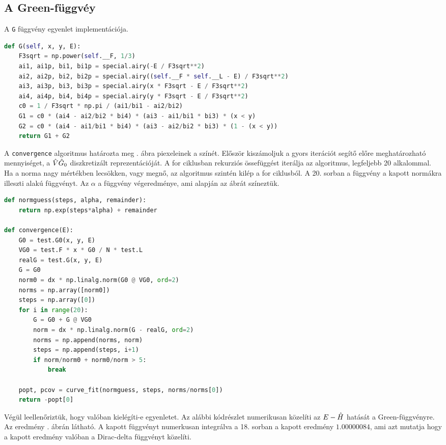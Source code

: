 \subsection{A Green-függvéy}
A \texttt{G} függvény  egyenlet implementációja. 
\begin{lstlisting}[language=Python]
def G(self, x, y, E):
    F3sqrt = np.power(self.__F, 1/3)
    ai1, ai1p, bi1, bi1p = special.airy(-E / F3sqrt**2)
    ai2, ai2p, bi2, bi2p = special.airy((self.__F * self.__L - E) / F3sqrt**2)
    ai3, ai3p, bi3, bi3p = special.airy(x * F3sqrt - E / F3sqrt**2)
    ai4, ai4p, bi4, bi4p = special.airy(y * F3sqrt - E / F3sqrt**2)
    c0 = 1 / F3sqrt * np.pi / (ai1/bi1 - ai2/bi2)
    G1 = c0 * (ai4 - ai2/bi2 * bi4) * (ai3 - ai1/bi1 * bi3) * (x < y)
    G2 = c0 * (ai4 - ai1/bi1 * bi4) * (ai3 - ai2/bi2 * bi3) * (1 - (x < y))
    return G1 + G2
\end{lstlisting}
A \texttt{convergence} algoritmus határozta meg . ábra piexeleinek a színét. Először kiszámoljuk a gyors iterációt segítő előre meghatározható mennyiséget, a $\hat{V}\hat{G}_0$ diszkretizált reprezentációját. A for ciklusban  rekurziós össefüggést iterálja az algoritmus, legfeljebb 20 alkalommal. Ha a norma nagy mértékben lecsökken, vagy megnő, az algoritmus szintén kilép a for ciklusból. A 20. sorban a függvény a kapott normákra illeszti  alakú függvényt. Az $\alpha$ a függvény végeredménye, ami alapján az ábrát színeztük.
\begin{lstlisting}[language=Python]
def normguess(steps, alpha, remainder):
    return np.exp(steps*alpha) + remainder

def convergence(E):
    G0 = test.G0(x, y, E)
    VG0 = test.F * x * G0 / N * test.L
    realG = test.G(x, y, E)
    G = G0
    norm0 = dx * np.linalg.norm(G0 @ VG0, ord=2)
    norms = np.array([norm0])
    steps = np.array([0])
    for i in range(20):
        G = G0 + G @ VG0
        norm = dx * np.linalg.norm(G - realG, ord=2)
        norms = np.append(norms, norm)
        steps = np.append(steps, i+1)
        if norm/norm0 + norm0/norm > 5:
            break
    
    popt, pcov = curve_fit(normguess, steps, norms/norms[0])
    return -popt[0]
\end{lstlisting}
Végül leellenőriztük, hogy  valóban kielégíti-e  egyenletet. Az alábbi kódrészlet numerikusan közelíti az $E-\hat{H}$ hatását a Green-függvényre. Az eredmény . ábrán látható. A kapott függvényt numerkusan integrálva a 18. sorban a kapott eredmény $1.00000084$, ami azt mutatja hogy a kapott eredmény valóban a Dirac-delta függvényt közelíti.
